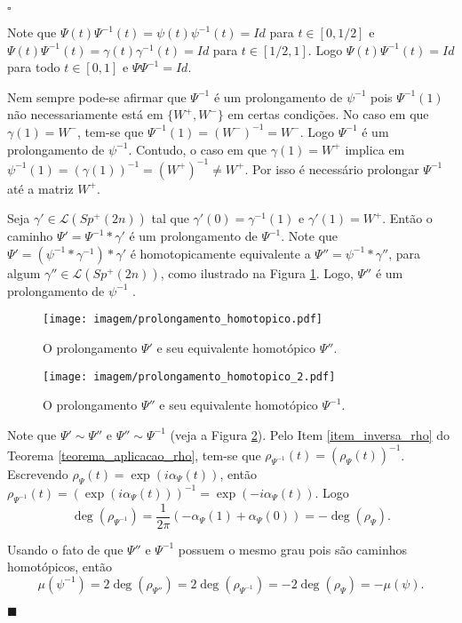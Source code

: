 \documentclass[12pt]{book}
\newenvironment{prova}[1]{$\square$ #1}{\hfill$\blacksquare$}
\newcommand{\caminhos}{\mathcal{L}}
\newcommand{\gruposimpleticonaodegenerado}[1]{Sp^{#1}(2n)}
\newcommand{\intervalo}{[0,1]}
\begin{document}
\begin{prova}
\begin{enumerate}
			Note que $\Psi(t)\Psi^{-1}(t) = \psi(t)\psi^{-1}(t) = Id$ para $t \in [0,1/2]$ e $\Psi(t)\Psi^{-1}(t) = \gamma(t)\gamma^{-1}(t) = Id$ para $t \in [1/2,1]$. Logo $\Psi(t)\Psi^{-1}(t) = Id$ para todo $t \in \intervalo$ e $\Psi\Psi^{-1} = Id$.
			
			Nem sempre pode-se afirmar que $\Psi^{-1}$ é um prolongamento de $\psi^{-1}$ pois $\Psi^{-1}(1)$ não necessariamente está em $\{W^{+},W^{-}\}$ em certas condições. No caso em que $\gamma(1)=W^{-}$, tem-se que $\Psi^{-1}(1) = (W^{-})^{-1}=W^{-}$. Logo $\Psi^{-1}$ é um prolongamento de $\psi^{-1}$. Contudo, o caso em que $\gamma(1)=W^{+}$ implica em $\psi^{-1}(1)= (\gamma(1))^{-1}=(W^{+})^{-1} \neq W^{+}$. Por isso é necessário prolongar $\Psi^{-1}$ até a matriz $W^{+}$.
			
			Seja $\gamma'\in \caminhos(\gruposimpleticonaodegenerado{+})$ tal que $\gamma'(0) = \gamma^{-1}(1)$ e $\gamma'(1)=W^{+}$. Então o caminho $\Psi'=\Psi^{-1}*\gamma'$ é um prolongamento de $\Psi^{-1}$. Note que $\Psi' = (\psi^{-1}*\gamma^{-1})*\gamma'$ é homotopicamente equivalente a $\Psi'' = \psi^{-1}*\gamma''$, para algum $\gamma''\in \caminhos(\gruposimpleticonaodegenerado{+})$, como ilustrado na Figura	 \ref{figura_prolongamento_homotopico}. Logo, $\Psi''$ é um prolongamento de $\psi^{-1}$ .  
			
			\begin{figure}[!h]
				\centering
				\texttt{[image: imagem/prolongamento\_homotopico.pdf]}
				\caption{O prolongamento $\Psi'$ e seu equivalente homotópico $\Psi''$.}
				\label{figura_prolongamento_homotopico}
			\end{figure}
			
			\begin{figure}[!h]
				\centering
				\texttt{[image: imagem/prolongamento\_homotopico\_2.pdf]}
				\caption{O prolongamento $\Psi''$ e seu equivalente homotópico $\Psi^{-1}$.}
				\label{figura_prolongamento_homotopico_2}
			\end{figure}
			
		
			
			Note que $\Psi'\sim \Psi''$ e $\Psi''\sim \Psi^{-1}$ (veja a Figura \ref{figura_prolongamento_homotopico_2}). Pelo Item \ref{item_inversa_rho} do Teorema \ref{teorema_aplicacao_rho}, tem-se que $\rho_{\Psi^{-1}}(t) = (\rho_{\Psi}(t))^{-1}$. Escrevendo $\rho_{\Psi}(t) = \exp(i\alpha_{\Psi}(t))$, então $\rho_{\Psi^{-1}}(t) =(\exp(i\alpha_{\Psi}(t)))^{-1}= \exp(-i\alpha_{\Psi}(t))$. Logo 
			$$
			\deg(\rho_{\Psi^{-1}})=\frac{1}{2\pi}(-\alpha_{\Psi}(1)+\alpha_{\Psi}(0)) =  -\deg(\rho_{\Psi}).
			$$
			
			Usando o fato de que $\Psi''$ e $\Psi^{-1}$ possuem o mesmo grau pois são caminhos homotópicos, então
			$$
			\mu(\psi^{-1})=2\deg(\rho_{\Psi''}) = 2\deg(\rho_{\Psi^{-1}}) = -2\deg(\rho_{\Psi})= -\mu(\psi).
			$$
		\end{enumerate}
	\end{prova}
	
\end{document}
